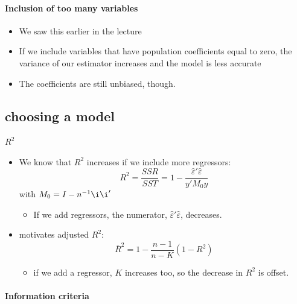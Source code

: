 \paragraph{Inclusion of too many variables}
\label{sec-2-1-2}

\begin{itemize}
\item We saw this earlier in the lecture
\item If we include variables that have population coefficients equal
        to zero, the variance of our estimator increases and the model
        is less accurate
\item The coefficients are still unbiased, though.
\end{itemize}
\subsection{choosing a model}
\label{sec-2-2}
\paragraph{$R^{2}$}
\label{sec-2-2-1}

\begin{itemize}
\item We know that $R^{2}$ increases if we include more regressors:
        \[R^{2} = \frac{SSR}{SST} = 1 -
        \frac{\hat{\varepsilon}'\hat{\varepsilon}}{y'M_{0}y}\]
        with $M_{0} = I - n^{-1} \i \i'$
\begin{itemize}
\item If we add regressors, the numerator,
          $\hat{\varepsilon}'\hat{\varepsilon}$, decreases.
\end{itemize}
\item motivates adjusted $R^{2}$:
        \[ \bar{R}^{2} = 1 - \frac{n-1}{n-K}(1-R^{2})\]
\begin{itemize}
\item if we add a regressor, $K$ increases too, so the decrease in
          $R^{2}$ is offset.
\end{itemize}
\end{itemize}
\paragraph{Information criteria}
\label{sec-2-2-2}

